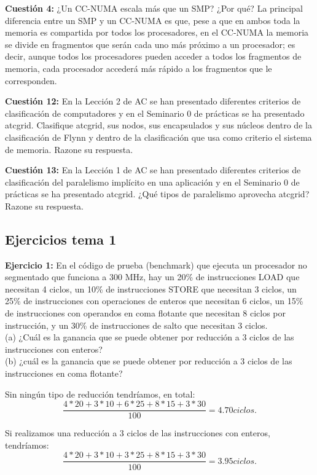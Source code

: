 \documentclass[a4paper, 11pt]{article}
\begin{document}
\textbf{\large{\textcolor{BurntOrange}{Cuestión 4:}}}
\textsf{¿Un CC-NUMA escala más que un SMP? ¿Por qué?} 
La principal diferencia entre un SMP y un CC-NUMA es que, pese a que en ambos toda la memoria es compartida por todos los procesadores, en el CC-NUMA la memoria se divide en fragmentos que serán cada uno más próximo a un procesador; es decir, aunque todos los procesadores pueden acceder a todos los fragmentos de memoria, cada procesador accederá más rápido a los fragmentos que le corresponden.

\textbf{\large{\textcolor{BurntOrange}{Cuestión 12:}}}
\textsf{En la Lección 2 de AC se han presentado diferentes criterios de clasificación de computadores y
	en el Seminario 0 de prácticas se ha presentado atcgrid. Clasifique atcgrid, sus nodos, sus encapsulados y sus
	núcleos dentro de la clasificación de Flynn y dentro de la clasificación que usa como criterio el sistema de
	memoria. Razone su respuesta. } 

\textbf{\large{\textcolor{BurntOrange}{Cuestión 13:}}}
\textsf{En la Lección 1 de AC se han presentado diferentes criterios de clasificación del paralelismo
	implícito en una aplicación y en el Seminario 0 de prácticas se ha presentado atcgrid. ¿Qué tipos de
	paralelismo aprovecha atcgrid? Razone su respuesta.} 




\subsection{Ejercicios tema 1}
\textbf{\large{\textcolor{BurntOrange}{Ejercicio 1:}}}
\textsf{En el código de prueba (benchmark) que ejecuta un procesador no segmentado que funciona a
300 MHz, hay un 20\% de instrucciones LOAD que necesitan 4 ciclos, un 10\% de instrucciones STORE que
necesitan 3 ciclos, un 25\% de instrucciones con operaciones de enteros que necesitan 6 ciclos, un 15\% de
instrucciones con operandos en coma flotante que necesitan 8 ciclos por instrucción, y un 30\% de
instrucciones de salto que necesitan 3 ciclos. 
\\(a) ¿Cuál es la ganancia que se puede obtener por reducción a 3 ciclos de las instrucciones con enteros?  
\\(b) ¿cuál es la ganancia que se puede obtener por reducción a 3 ciclos de las instrucciones en coma flotante?}

Sin ningún tipo de reducción tendríamos, en total: $$\frac{4*20+3*10+6*25+8*15+3*30}{100} = 4.70 ciclos.$$

Si realizamos una reducción a 3 ciclos de las instrucciones con enteros, tendríamos: $$\frac{4*20+3*10+3*25+8*15+3*30}{100} = 3.95 ciclos.$$
\end{document}
